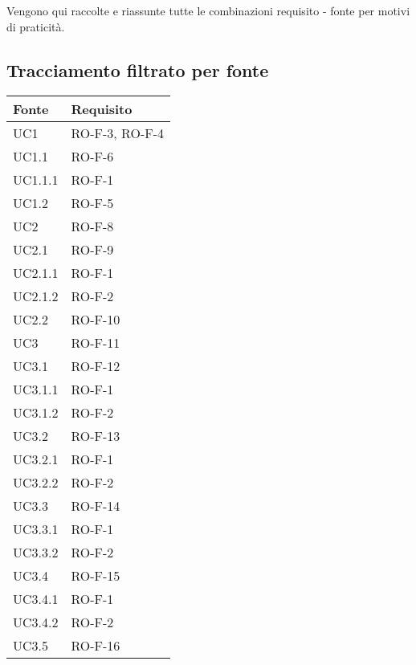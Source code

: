 Vengono qui raccolte e riassunte tutte le combinazioni requisito - fonte per motivi di praticità.
\subsection{Tracciamento filtrato per fonte}
\begin{center}
\renewcommand{\arraystretch}{1.8} %
\begin{tabular}{ |m{8em}|m{13em}| }
    \hline
    \textbf{Fonte} & \textbf{Requisito} \\
    \hline
    UC1         &   RO-F-3, RO-F-4 \\
    \hline
    UC1.1       &   RO-F-6 \\
    \hline
    UC1.1.1     &   RO-F-1 \\
    \hline
    UC1.2       &   RO-F-5 \\
    \hline
    UC2         &   RO-F-8 \\
    \hline
    UC2.1       &   RO-F-9 \\
    \hline
    UC2.1.1     &   RO-F-1 \\
    \hline
    UC2.1.2     &   RO-F-2 \\
    \hline
    UC2.2       &   RO-F-10 \\
    \hline
    UC3         &   RO-F-11 \\
    \hline
    UC3.1       &   RO-F-12 \\
    \hline
    UC3.1.1     &   RO-F-1 \\
    \hline
    UC3.1.2     &   RO-F-2 \\
    \hline
    UC3.2       &   RO-F-13 \\
    \hline
    UC3.2.1     &   RO-F-1 \\
    \hline
    UC3.2.2     &   RO-F-2 \\
    \hline
    UC3.3       &   RO-F-14 \\
    \hline
    UC3.3.1     &   RO-F-1 \\
    \hline
    UC3.3.2     &   RO-F-2 \\
    \hline
    UC3.4       &   RO-F-15 \\
    \hline
    UC3.4.1     &   RO-F-1 \\
    \hline
    UC3.4.2     &   RO-F-2 \\
    \hline
    UC3.5       &   RO-F-16 \\
    \hline
    \end{tabular}
    \newpage
    \begin{tabular}{ |m{8em}|m{13em}| }

\end{tabular}
\end{center}
